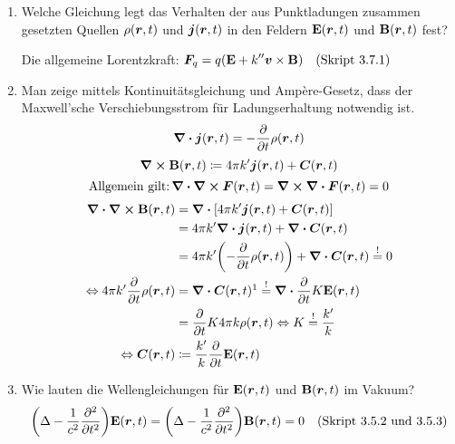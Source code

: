 \begin{enumerate}
  \item Welche Gleichung legt das Verhalten der aus Punktladungen %
        zusammen gesetzten Quellen $\rho(\vb* r, t)$ und 
        $\vb* j(\vb* r, t)$ in den Feldern $\vb E(\vb* r, t)$
        und $\vb B(\vb* r, t)$ fest?
        \begin{center}
          Die allgemeine Lorentzkraft: 
          $\displaystyle \vb* F_q=q\qty(\vb E+k''\vb* v\times\vb B)\quad\text{(Skript 3.7.1)}$
        \end{center}

  \item Man zeige mittels Kontinuitätsgleichung und Ampère-Gesetz, %
        dass der Maxwell'sche Verschiebungsstrom für Ladungserhaltung
        notwendig ist.
        $$\div \vb* j(\vb* r, t) = -\pdv{t}\rho(\vb* r ,t)$$
        $$\curl\vb B(\vb* r, t) \coloneqq 
        4\pi k'\vb* j(\vb* r ,t) + \vb* C(\vb* r, t)$$
        $$\text{Allgemein gilt:}\,\div\curl\vb* F(\vb* r, t)
        =\curl \div \vb* F(\vb* r, t)=0$$
        \begin{equation*}
          \begin{split}
          \ds \div\curl\vb B(\vb* r, t)
                      &\ds= \div \qty[
                      4\pi k'\vb* j(\vb* r, t)+\vb* C(\vb* r, t)]\\
                      &\ds= 4\pi k'\div\vb* j(\vb* r,t) +
                      \div \vb* C(\vb* r,t)\\
                      &\ds= 4\pi k'\qty(-\pdv{t}\rho(\vb* r, t)) 
                      +\div \vb* C(\vb* r,t)\stackrel{!}{=}0\\
          \Leftrightarrow\ds 4\pi k'\pdv{t}\rho(\vb* r, t) 
                      &\ds =\div \vb* 
                      C(\vb* r, t)\footnotemark
                      \stackrel{!}{=}\div \pdv{t}K\vb E(\vb* r, t)\\
                      &\ds =\ds \pdv{t} 
                      K4\pi k \rho(\vb* r, t)
          \Leftrightarrow K         
                      \stackrel{!}{=}\frac{k'}{k}\\
          \Leftrightarrow \vb* C(\vb* r,t)
                      &\coloneqq \frac{k'}{k}\pdv{t}\vb E(\vb* r, t)
          \end{split}
        \end{equation*}

  \item Wie lauten die Wellengleichungen für $\vb E(\vb* r, t)$ und %
        $\vb B(\vb* r, t)$ im Vakuum?
        $$\qty(\Delta - \frac{1}{c^2}\pdv[2]{t})\vb E(\vb* r, t)=
        \qty(\Delta - \frac{1}{c^2}\pdv[2]{t})\vb B(\vb* r, t)=0
        \quad\text{(Skript 3.5.2 und 3.5.3)}$$


\end{enumerate}
